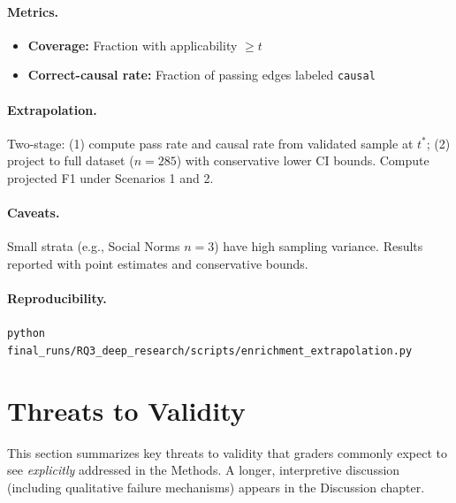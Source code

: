 \paragraph{Metrics.}
\begin{itemize}[noitemsep]
    \item \textbf{Coverage:} Fraction with applicability $\geq t$
    \item \textbf{Correct-causal rate:} Fraction of passing edges labeled \texttt{causal}
\end{itemize}

\paragraph{Extrapolation.}
Two-stage: (1) compute pass rate and causal rate from validated sample at $t^*$; (2) project to full dataset ($n=285$) with conservative lower CI bounds. Compute projected F1 under Scenarios 1 and 2.

\paragraph{Caveats.}
Small strata (e.g., Social Norms $n=3$) have high sampling variance. Results reported with point estimates and conservative bounds.

\paragraph{Reproducibility.}
\texttt{python final\_runs/RQ3\_deep\_research/scripts/enrichment\_extrapolation.py}

\section{Threats to Validity}
\label{sec:threats_to_validity}

This section summarizes key threats to validity that graders commonly expect to see \emph{explicitly} addressed in the Methods. A longer, interpretive discussion (including qualitative failure mechanisms) appears in the Discussion chapter.

